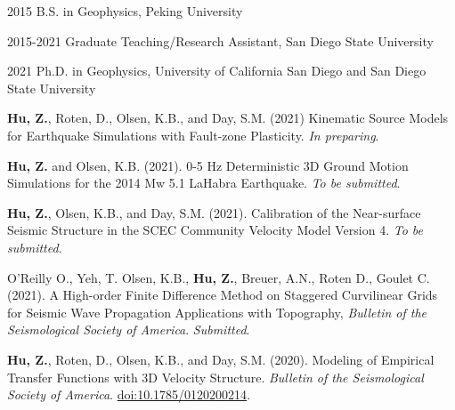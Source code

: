 \begin{frontmatter}
\begin{acknowledgements}
    \end{acknowledgements}


    \begin{vitapage}
        \begin{vita}
            \item[2015] B.S. in Geophysics, Peking University
            \item[2015-2021] Graduate Teaching/Research Assistant, San Diego State University
            \item[2021] Ph.D. in Geophysics, University of California San Diego and San Diego State University
        \end{vita}
        \begin{publications}
            \item \textbf{Hu, Z.}, Roten, D., Olsen, K.B., and Day, S.M. (2021) Kinematic Source Models for Earthquake Simulations with Fault-zone Plasticity. \emph{In preparing}.
            \item \textbf{Hu, Z.} and Olsen, K.B. (2021). 0-5 Hz Deterministic 3D Ground Motion Simulations for the 2014 Mw 5.1 LaHabra Earthquake. \emph{To be submitted}.
            \item \textbf{Hu, Z.}, Olsen, K.B., and Day, S.M. (2021). Calibration of the Near-surface Seismic Structure in the SCEC Community Velocity Model Version 4. \emph{To be submitted}.
            \item O'Reilly O., Yeh, T. Olsen, K.B., \textbf{Hu, Z.}, Breuer, A.N., Roten D., Goulet C. (2021). A High-order Finite Difference Method on Staggered Curvilinear Grids for Seismic Wave Propagation Applications with Topography, \emph{Bulletin of the Seismological Society of America}. \emph{Submitted}.
            \item \textbf{Hu, Z.}, Roten, D., Olsen, K.B., and Day, S.M. (2020). Modeling of Empirical Transfer Functions with 3D Velocity Structure. \emph{Bulletin of the Seismological Society of America}. \url{doi:10.1785/0120200214}.


        \end{publications}
    \end{vitapage}



\end{frontmatter}
